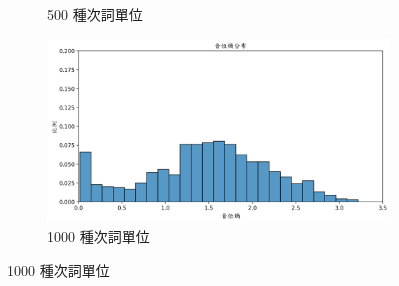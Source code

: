{{{{\begin{figure}
\begin{subfigure}{\textwidth}
                 \caption{500 種次詞單位}
                 \label{fig:hub-u050-ap0500-phnent-hist}
             \end{subfigure}
             \vfill
             \begin{subfigure}{\textwidth}
                 \centering
                 \includegraphics[width=\tempwidth]{feasiblefigs/ch4figs/hub-u050-ap1000-phnent-hist.png}
                 \caption{1000 種次詞單位}
                 \label{fig:hub-u050-ap1000-phnent-hist}
             \end{subfigure}


\end{figure}}}}}
